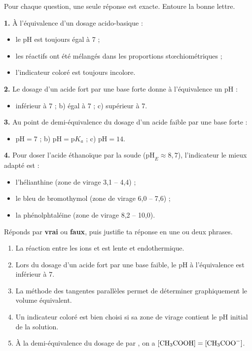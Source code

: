 \documentclass[11pt]{article}
\begin{document}
\begin{exercice}
Pour chaque question, une seule réponse est exacte. Entoure la bonne lettre.

\textbf{1.} À l'équivalence d'un dosage acido-basique :
\begin{itemize}
\item[a)] le pH est toujours égal à 7 ;
\item[b)] les réactifs ont été mélangés dans les proportions stœchiométriques ;
\item[c)] l'indicateur coloré est toujours incolore.
\end{itemize}

\textbf{2.} Le dosage d'un acide fort par une base forte donne à l'équivalence un pH :
\begin{itemize}
\item[a)] inférieur à 7 ; \quad b) égal à 7 ; \quad c) supérieur à 7.
\end{itemize}

\textbf{3.} Au point de demi-équivalence du dosage d'un acide faible par une base forte :
\begin{itemize}
\item[a)] $\mathrm{pH} = 7$ ; \quad b) $\mathrm{pH} = \mathrm{p}K_a$ ; \quad c) $\mathrm{pH} = 14$.
\end{itemize}

\textbf{4.} Pour doser l'acide éthanoïque par la soude ($\mathrm{pH}_E \approx 8,7$), l'indicateur le mieux adapté est :
\begin{itemize}
\item[a)] l'hélianthine (zone de virage 3,1 -- 4,4) ;
\item[b)] le bleu de bromothymol (zone de virage 6,0 -- 7,6) ;
\item[c)] la phénolphtaléine (zone de virage 8,2 -- 10,0).
\end{itemize}
\end{exercice}

\begin{exercice}
Réponds par \textbf{vrai} ou \textbf{faux}, puis justifie ta réponse en une ou deux phrases.
\begin{enumerate}
\item La réaction entre les ions  et  est lente et endothermique.
\item Lors du dosage d'un acide fort par une base faible, le pH à l'équivalence est inférieur à 7.
\item La méthode des tangentes parallèles permet de déterminer graphiquement le volume équivalent.
\item Un indicateur coloré est bien choisi si sa zone de virage contient le pH initial de la solution.
\item À la demi-équivalence du dosage de  par , on a $[\ce{CH3COOH}] = [\ce{CH3COO-}]$.
\end{enumerate}
\end{exercice}
\end{document}
